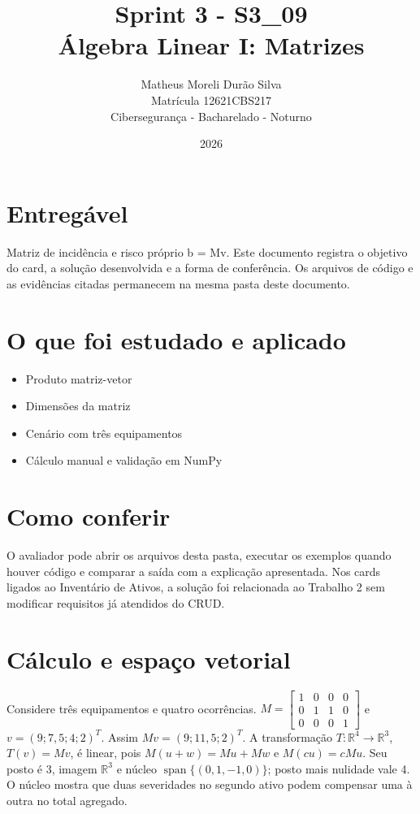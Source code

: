 \documentclass[12pt]{article}
\title{Sprint 3 - S3\_09\\Álgebra Linear I: Matrizes}
\author{Matheus Moreli Durão Silva\\Matrícula 12621CBS217\\Cibersegurança - Bacharelado - Noturno}
\date{2026}
\begin{document}
\maketitle

\section*{Entregável}
Matriz de incidência e risco próprio b = Mv. Este documento registra o objetivo do card, a solução desenvolvida e a forma de conferência. Os arquivos de código e as evidências citadas permanecem na mesma pasta deste documento.

\section*{O que foi estudado e aplicado}
\begin{itemize}
\item Produto matriz-vetor
\item Dimensões da matriz
\item Cenário com três equipamentos
\item Cálculo manual e validação em NumPy
\end{itemize}

\section*{Como conferir}
O avaliador pode abrir os arquivos desta pasta, executar os exemplos quando houver código e comparar a saída com a explicação apresentada. Nos cards ligados ao Inventário de Ativos, a solução foi relacionada ao Trabalho 2 sem modificar requisitos já atendidos do CRUD.

\section*{Cálculo e espaço vetorial}
Considere três equipamentos e quatro ocorrências. $M=\left[\begin{smallmatrix}1&0&0&0\\0&1&1&0\\0&0&0&1\end{smallmatrix}\right]$ e $v=(9;7,5;4;2)^T$. Assim $Mv=(9;11,5;2)^T$. A transformação $T:\mathbb R^4\to\mathbb R^3$, $T(v)=Mv$, é linear, pois $M(u+w)=Mu+Mw$ e $M(cu)=cMu$. Seu posto é 3, imagem $\mathbb R^3$ e núcleo $\operatorname{span}\{(0,1,-1,0)\}$; posto mais nulidade vale 4. O núcleo mostra que duas severidades no segundo ativo podem compensar uma à outra no total agregado.
\end{document}
